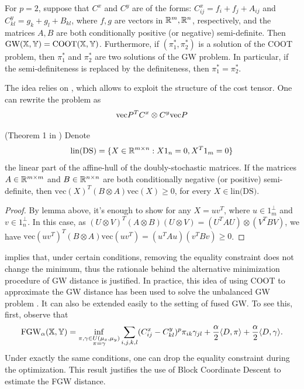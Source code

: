 \begin{proposition}
  \label{prop:coot_gw_equiv}
  For $p=2$, suppose that $C^x$ and $C^y$ are of the forms:
  $C^x_{ij} = f_i + f_j + A_{ij}$ and $C^y_{kl} = g_k + g_l + B_{kl}$,
  where $f, g$ are vectors in $\mathbb R^m, \mathbb R^n$, respectively,
  and the matrices $A, B$ are both conditionally positive (or negative) semi-definite.
  Then $\text{GW}(\mathbb X, \mathbb Y) = \text{COOT}(\mathbb X, \mathbb Y)$.
  Furthermore, if $(\pi_1^*, \pi_2^*)$ is a solution of the COOT problem, then $\pi_1^*$ and $\pi_2^*$
  are two solutions of the GW problem. In particular,
  if the semi-definiteness is replaced by the definiteness, then $\pi_1^* = \pi_2^*$.
\end{proposition}
The idea relies on \citep{Maron18}, which allows to exploit the structure of the cost tensor.
One can rewrite the problem as
\begin{align}
  \text{vec}{P}^T C^x \otimes C^y \text{vec}{P}
\end{align}
\begin{proposition}
  (Theorem 1 in \citep{Maron18}) Denote
\begin{equation*}
    \text{lin(DS)} = \{X \in \mathbb R^{m \times n}: X 1_n = 0, X^T 1_m = 0 \}
\end{equation*}
the linear part of the affine-hull of the doubly-stochastic matrices. If the matrices $A \in \mathbb R^{m \times m}$ and
  $B \in \mathbb R^{n \times n}$ are both conditionally negative (or positive) semi-definite, then $\text{vec}(X)^T (B \otimes A) \text{vec}(X) \geq 0$, for every $X \in \text{lin(DS)}$.
\end{proposition}
\begin{proof}
    By lemma above, it's enough to show for any $X = u v^T$, where $u \in 1^{\perp}_m$
    and $v \in 1^{\perp}_n$. In this case, as
    $(U \otimes V)^T (A \otimes B) (U \otimes V) = (U^T A U) \otimes (V^T B V)$, we have
    $\text{vec}(u v^T)^T (B \otimes A) \text{vec}(u v^T) = (u^T A u) (v^T B v) \geq 0$.
\end{proof}
 implies that, under certain conditions, removing
the equality constraint does not change the minimum,
thus the rationale behind the alternative minimization procedure of GW distance is justified.
In practice, this idea of using COOT to approximate the GW distance has been used to
solve the unbalanced GW problem \citep{Sejourne20,Thual22}. It can also be extended
easily to the setting of fused GW. To see this, first, observe that
\begin{align}
  \text{FGW}_{\alpha}(\mathbb X, \mathbb Y) =
  \inf_{\substack{\pi, \gamma \in U(\mu_x, \mu_y) \\ \pi = \gamma }}
  \sum_{i,j,k,l} (C^x_{ij} - C^y_{kl})^p \pi_{ik} \gamma_{jl} +
  \frac{\alpha}{2} \langle D, \pi \rangle + \frac{\alpha}{2} \langle D, \gamma \rangle.
\end{align}
Under exactly the same conditions, one can drop the equality constraint during the optimization.
This result justifies the use of Block Coordinate Descent to estimate the FGW distance.

